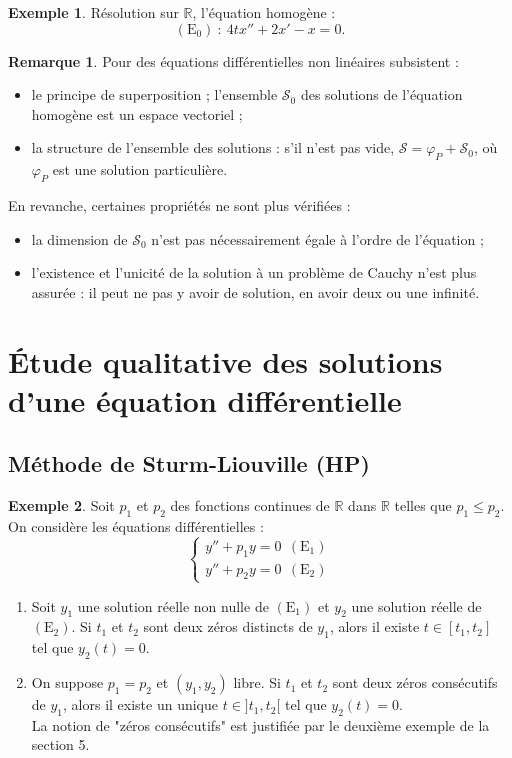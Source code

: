 \documentclass[french]{article}
\newcommand{\R}{\mathbb{R}}
\theoremstyle{plain}
\theoremstyle{definition}
\newtheorem*{ex}{Exemple}
\newtheorem*{rmq}{Remarque}
\theoremstyle{remark}
\begin{document}
\begin{ex}
	Résolution sur $\R$, l'équation homogène :
	$$(\text{E}_0)\ :\ 4tx''+2x'-x=0.$$
\end{ex}

\begin{rmq}
	Pour des équations différentielles non linéaires subsistent :
	\begin{itemize}
		\item le principe de superposition ;
		l'ensemble $\mathcal{S}_0$ des solutions de l'équation homogène est un espace vectoriel ;
		\item la structure de l'ensemble des solutions : s'il n'est pas vide, $\mathcal{S}=\varphi_P+\mathcal{S}_0$, où $\varphi_P$ est une solution particulière.
	\end{itemize}
	En revanche, certaines propriétés ne sont plus vérifiées :
	\begin{itemize}
		\item la dimension de $\mathcal{S}_0$ n'est pas nécessairement égale à l'ordre de l'équation ;
		\item l'existence et l'unicité de la solution à un problème de Cauchy n'est plus assurée : il peut ne pas y avoir de solution, en avoir deux ou une infinité.
	\end{itemize}
\end{rmq}

\section{Étude qualitative des solutions d'une équation différentielle}

\subsection{Méthode de Sturm-Liouville (HP)}

\begin{ex}
	Soit $p_1$ et $p_2$ des fonctions continues de $\R$ dans $\R$ telles que $p_1\leqslant p_2$. On considère les équations différentielles : $$\begin{cases}
		y''+p_1y=0 \ \ (\text{E}_1) \\
		y''+p_2y=0 \ \ (\text{E}_2)
	\end{cases}$$
	\begin{enumerate}
		\item Soit $y_1$ une solution réelle non nulle de $(\text{E}_1)$ et $y_2$ une solution réelle de $(\text{E}_2)$. Si $t_1$ et $t_2$ sont deux zéros distincts de $y_1$, alors il existe $t\in[t_1,t_2]$ tel que $y_2(t)=0$.
		\item On suppose $p_1=p_2$ et $(y_1,y_2)$ libre. Si $t_1$ et $t_2$ sont deux zéros consécutifs de $y_1$, alors il existe un unique $t\in]t_1,t_2[$ tel que $y_2(t)=0$. \\
		La notion de "zéros consécutifs" est justifiée par le deuxième exemple de la section 5.
	\end{enumerate}
\end{ex}
\end{document}
